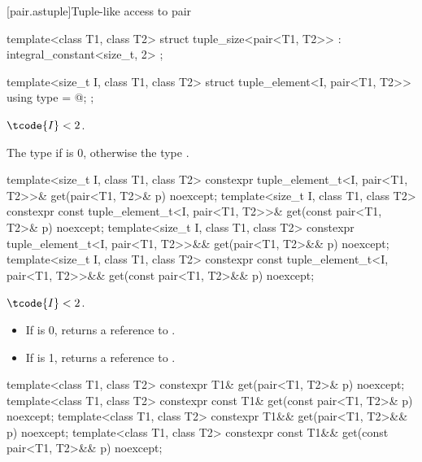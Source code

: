 [pair.astuple]{Tuple-like access to pair}

%
\begin{itemdecl}
template<class T1, class T2>
  struct tuple_size<pair<T1, T2>> : integral_constant<size_t, 2> { };
\end{itemdecl}

%
\begin{itemdecl}
template<size_t I, class T1, class T2>
  struct tuple_element<I, pair<T1, T2>> {
    using type = @\seebelow@ ;
  };
\end{itemdecl}
\begin{itemdescr}
\pnum
\mandates
$\tcode{I} < 2$.

\pnum
\ctype
The type  if  is 0, otherwise the type .
\end{itemdescr}

%
\begin{itemdecl}
template<size_t I, class T1, class T2>
  constexpr tuple_element_t<I, pair<T1, T2>>& get(pair<T1, T2>& p) noexcept;
template<size_t I, class T1, class T2>
  constexpr const tuple_element_t<I, pair<T1, T2>>& get(const pair<T1, T2>& p) noexcept;
template<size_t I, class T1, class T2>
  constexpr tuple_element_t<I, pair<T1, T2>>&& get(pair<T1, T2>&& p) noexcept;
template<size_t I, class T1, class T2>
  constexpr const tuple_element_t<I, pair<T1, T2>>&& get(const pair<T1, T2>&& p) noexcept;
\end{itemdecl}

\begin{itemdescr}
\pnum
\mandates
$\tcode{I} < 2$.

\pnum
\returns
\begin{itemize}
\item If  is 0, returns a reference to .
\item If  is 1, returns a reference to .
\end{itemize}
\end{itemdescr}

%
\begin{itemdecl}
template<class T1, class T2>
  constexpr T1& get(pair<T1, T2>& p) noexcept;
template<class T1, class T2>
  constexpr const T1& get(const pair<T1, T2>& p) noexcept;
template<class T1, class T2>
  constexpr T1&& get(pair<T1, T2>&& p) noexcept;
template<class T1, class T2>
  constexpr const T1&& get(const pair<T1, T2>&& p) noexcept;
\end{itemdecl}


